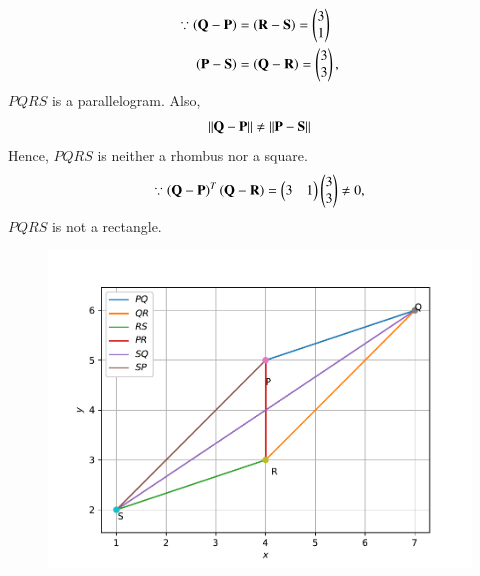 \begin{enumerate}[label=\thesubsection.\arabic*.,ref=\thesubsection.\theenumi]
\begin{enumerate}
\begin{align}
\because \left(\mathbf{Q} - \mathbf{P}\right) &= \left(\mathbf{R} - \mathbf{S}\right) = \begin{pmatrix}3\\1\end{pmatrix}
\\
\left(\mathbf{P} - \mathbf{S}\right) &= \left(\mathbf{Q} - \mathbf{R}\right) = \begin{pmatrix}3\\3\end{pmatrix},
\end{align}
$PQRS$ is a parallelogram.  Also, 
%
\begin{align}
\left\lVert\mathbf{Q} - \mathbf{P}\right\rVert \ne \left\lVert\mathbf{P} - \mathbf{S}\right\rVert
\end{align}
Hence, $PQRS$ is neither a rhombus nor a square.
\begin{align}
\because \left(\mathbf{Q} - \mathbf{P}\right)^T \left(\mathbf{Q} - \mathbf{R}\right) = \begin{pmatrix}3 & 1\end{pmatrix}\begin{pmatrix}3\\3\end{pmatrix} \ne 0,
\end{align}
$PQRS$ is not a rectangle. 
%
\begin{figure}[!ht]
	\centering
	\includegraphics[width=\columnwidth]{./figs/vectors/quad3.pdf}
	\caption{}
	\label{fig:3.5.4_quadrilateral3}
\end{figure}

\end{enumerate}


\end{enumerate}
